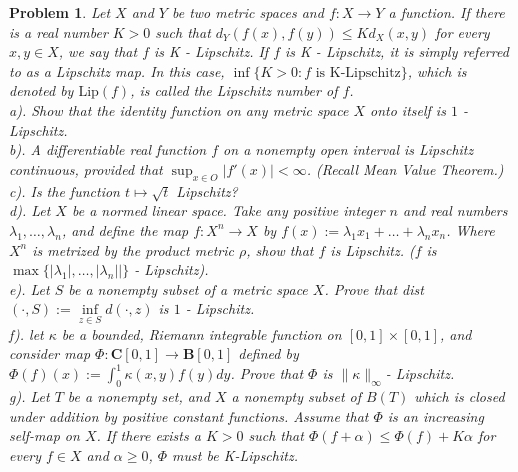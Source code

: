 \documentclass[12pt]{article}
\newtheorem{problem}{Problem}
\begin{document}
\begin{problem}
Let $X$ and $Y$ be two metric spaces and $f: X\to Y$ a function. If there is a real number $K>0$ such that $d_{Y}(f(x), f(y))\leq Kd_{X}(x,y)$ for every $x,y\in X$, we say that $f$ is K - Lipschitz. If $f$ is K - Lipschitz, it is simply referred to as a Lipschitz map. In this case, $\inf\{K>0: f\text{ is K-Lipschitz}\}$, which is denoted by $\text{Lip}(f)$, is called the Lipschitz number of $f$. \\
\indent a). Show that the identity function on any metric space $X$ onto itself is $1$ - Lipschitz. \\
\indent b). A differentiable real function $f$ on a nonempty open interval is Lipschitz continuous, provided that $\sup_{x\in O}|f'(x)|<\infty$. (Recall Mean Value Theorem.) \\
\indent c). Is the function $t\mapsto \sqrt{t}$ Lipschitz? \\
\indent d). Let $X$ be a normed linear space. Take any positive integer $n$ and real numbers $\lambda_{1}, \dots, \lambda_{n}$, and define the map $f: X^{n}\to X$ by $f(x):=\lambda_{1}x_{1}+\dots+\lambda_{n}x_{n}$. Where $X^{n}$ is metrized by the product metric $\rho$, show that $f$ is Lipschitz. ($f$ is $\max\{|\lambda_{1}|, \dots, |\lambda_{n}||\}$ - Lipschitz). \\
\indent e). Let $S$ be a nonempty subset of a metric space $X$. Prove that dist $(\cdot, S):= \inf\limits_{z\in S}d(\cdot ,z)$ is $1$ - Lipschitz. \\
\indent f). let $\kappa$ be a bounded, Riemann integrable function on $[0,1]\times[0,1]$, and consider map $\Phi:\mathbf{C}[0, 1]\to \mathbf{B}[0, 1]$ defined by $\Phi(f)(x):=\int_{0}^{1}\kappa(x,y)f(y)dy$. Prove that $\Phi$ is $\|\kappa\|_{\infty}$- Lipschitz. \\
\indent g). Let $T$ be a nonempty set, and $X$ a nonempty subset of $B(T)$ which is closed under addition by positive constant functions. Assume that $\Phi$ is an increasing self-map on $X$. If there exists a $K>0$ such that $\Phi(f+\alpha)\leq \Phi(f)+K\alpha$ for every $f\in X$ and $\alpha\geq 0$, $\Phi$ must be K-Lipschitz.
\end{problem}
\end{document}
